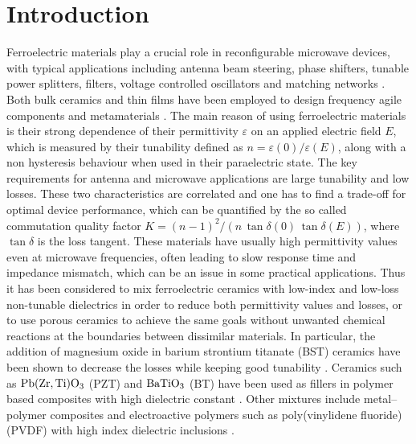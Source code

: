 \documentclass[%
 aip,
 amsmath,amssymb,
 reprint,%
]{revtex4-1}
\newcommand{\co}[1]{#1}
\begin{document}
 \section{Introduction}
 Ferroelectric materials play a crucial role in reconfigurable
 microwave devices, with typical applications including antenna beam steering,
 phase shifters, tunable power splitters, filters, voltage controlled oscillators and
 matching networks \cite{tagantsev_ferroelectric_2018}. Both bulk ceramics and thin films have
 been employed to design frequency agile components \cite{vendik_ferroelectric_1999,
 lancaster_thin-film_1998,xi_oxide_2000} and metamaterials \cite{hand_frequency_2008, zhao_experimental_2008}.
 The main reason of using
 ferroelectric materials is their strong dependence of their permittivity $\varepsilon$
 on an applied electric field $E$, which is measured by their tunability defined as $n = \varepsilon(0)/\varepsilon(E)$,
 along with a non hysteresis behaviour when used in their paraelectric state.
 The key requirements for antenna and microwave applications are large tunability and low losses.
 These two characteristics are correlated and one has to find a trade-off for optimal
  device performance, which can be quantified by the so called commutation quality factor
 $K = (n -1)^2/(n\, \tan\delta(0)\,\tan\delta(E))$, where $\tan\delta$ is the loss tangent.
 These materials have usually high permittivity values even at microwave frequencies,
 often leading to slow response time and impedance mismatch, which can be an issue in some practical
 applications. Thus it has been considered to mix ferroelectric \co{ceramics with} low-index and
 low-loss non-tunable dielectrics in order to reduce both permittivity values and losses, or to
 use porous ceramics to achieve the same goals without unwanted chemical reactions at the boundaries between dissimilar materials. \co{In particular, the addition of magnesium oxide in barium strontium titanate (BST) ceramics have been shown to decrease the losses while keeping good tunability \cite{irvin_three-dimensional_2005,chung_low-losses_2008}. Ceramics
 such as $\rm Pb(Zr,Ti)O_3$ (PZT) and $\rm BaTiO_3$ (BT) have been used as fillers in polymer
 based composites with high dielectric constant \cite{wang_piezoelectric_2012}. Other mixtures include metal–polymer composites \cite{li_ferroelectric_2013}
 and electroactive polymers such as poly(vinylidene fluoride) (PVDF) with high index dielectric inclusions \cite{hu_preparation_2015}.
 }
\end{document}
